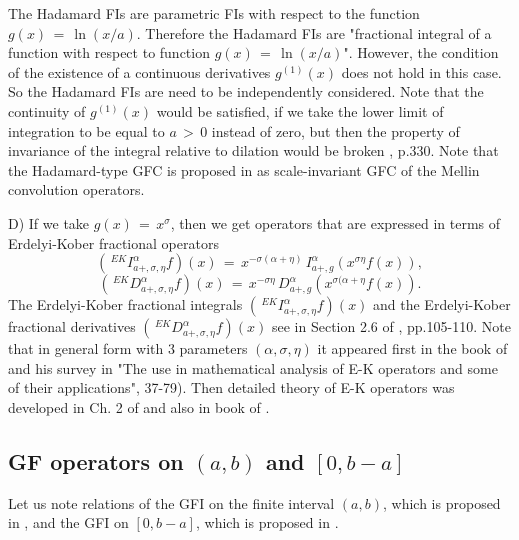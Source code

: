 \documentclass[12pt]{article}
\begin{document}

The Hadamard FIs are parametric FIs with respect to the function 
$g(x) \, = \, \ln(x/a)$. 
Therefore the Hadamard FIs are "fractional integral of a function with respect to function $g(x) \, = \, \ln(x/a)$". 
However, the condition of the existence of a continuous derivatives $g^{(1)}(x)$
does not hold in this case. 
So the Hadamard FIs are need to be independently considered. 
Note that the continuity of $g^{(1)}(x)$ would be satisfied, if we take the lower limit of integration to be equal to $a \, > \, 0$ instead of zero, but then the property of invariance of the integral relative to dilation would be broken \cite{SKM}, p.330. 
Note that the Hadamard-type GFC is proposed 
in \cite{FF-2023} as scale-invariant GFC of the Mellin convolution operators. 



D) If we take $g(x) \, = \, x^{\sigma}$, then we get operators that are expressed in terms of Erdelyi-Kober fractional operators
\[
(\, ^{EK}I^{\alpha}_{a+, \sigma, \eta} f)(x) \, = \, 
x^{-\sigma (\alpha+\eta)} \, 
I^{\alpha}_{a+,g}(x^{\sigma \eta} f(x)) ,
\]
\[
(\, ^{EK}D^{\alpha}_{a+, \sigma, \eta} f)(x) \, = \, 
x^{-\sigma \eta} \, 
D^{\alpha}_{a+,g}(x^{\sigma (\alpha + \eta} f(x)) .
\]
The Erdelyi-Kober fractional integrals 
$(\, ^{EK}I^{\alpha}_{a+, \sigma, \eta} f)(x)$ and
the Erdelyi-Kober fractional derivatives $(\, ^{EK}D^{\alpha}_{a+, \sigma, \eta} f)(x)$ see in Section 2.6 of \cite{KST}, pp.105-110.
Note that in general form with 3 parameters $(\alpha, \sigma, \eta)$ it appeared first in the book of \cite{Sneddon1} and his survey in \cite{Sneddon1}\cite{Sneddon2} "The use in mathematical analysis of E-K operators and some of their applications", 37-79). Then detailed theory of E-K operators was developed in Ch. 2 of \cite{Kiryakova} and also in book of \cite{YakubovichLuchko}.




\subsection{GF operators on $(a,b)$ and $[0,b-a]$}

Let us note relations of the GFI on the finite interval $(a,b)$, which is proposed in \cite{Luchko2023},
and the GFI on $[0,b-a]$, which is proposed in \cite{Luchko2021-1}.
\end{document}
